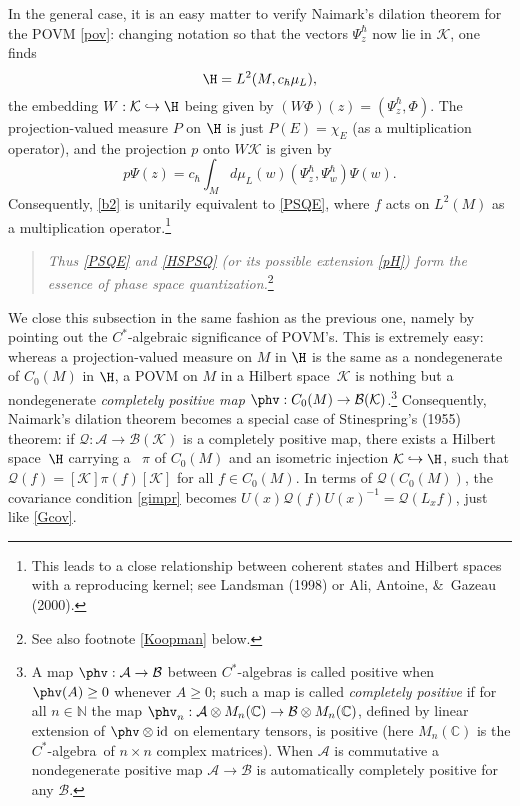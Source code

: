 \documentclass[12pt,titlepage]{article}
\newcommand{\beq}{\begin{equation}}
\newcommand{\eeq}{\end{equation}}
\newcommand{\ca}{$C^*$-algebra} \newcommand{\jba}{JB-algebra}
\newcommand{\Hs}{Hilbert space} \newcommand{\Bs}{Banach space}
\newcommand{\id}{\mbox{\rm id}}
\newcommand{\raw}{\rightarrow} \newcommand{\rat}{\mapsto}
\newcommand{\hraw}{\hookrightarrow} \newcommand{\Law}{\Leftarrow}
\newcommand{\x}{\times} \newcommand{\hb}{\hbar}
\newcommand{\inv}{^{-1}} \newcommand{\sa}{_{\R}}
\newcommand{\er}{\eqref}
\newcommand{\ch}{\chi} \newcommand{\ps}{\psi} \newcommand{\Ps}{\Psi}
\newcommand{\CA}{{\mathcal A}} \newcommand{\CB}{{\mathcal B}}
\newcommand{\CK}{{\mathcal K}}   \newcommand{\CL}{{\mathcal L}}
\newcommand{\CQ}{{\mathcal Q}} \newcommand{\CR}{{\mathcal R}}
\renewcommand{\C}{{\mathbb C}} \newcommand{\D}{{\mathbb D}}
\newcommand{\N}{{\mathbb N}} \newcommand{\R}{{\mathbb R}}
\begin{document}
 In the general case, it is an easy matter to verify Naimark's dilation theorem for the POVM \er{pov}:
 changing notation so that the vectors $\Psi_z^{\hbar}$ now lie in $\CK$,
 one finds 
 \beq \H=L^2(M, c_{\hbar}\mu_L), \label{HSPSQ}
 \eeq
 the embedding $W:\CK\hraw\H$ being given by $(W\Phi)(z)=(\Psi^{\hbar}_z,\Phi)$. The projection-valued measure $P$ on $\H$ is just $P(E)=\ch_E$ (as a multiplication operator), and the projection $p$ onto $W\CK$ is given by 
 \beq p\Psi(z)=c_{\hbar} \int_M  d\mu_L(w) (\Psi^{\hbar}_{z},\Psi^{\hbar}_{w})\Psi(w).\eeq
 Consequently, \er{b2} is unitarily equivalent
 to \er{PSQE}, where $f$ acts on $L^2(M)$ as a multiplication operator.\footnote{This leads to a close relationship between coherent states and \Hs s with a reproducing kernel; see Landsman (1998) or Ali, Antoine, \&\ Gazeau (2000).}  
\begin{quote}{\it Thus \er{PSQE} and \er{HSPSQ} (or its possible extension \er{pH}) form the essence of phase space quantization.}\footnote{See also footnote  \ref{Koopman} below.}
\end{quote}
  
 We close this subsection in the same fashion as the previous one, namely by pointing out the \ca ic significance of POVM's. This is extremely easy: whereas
 a projection-valued measure on $M$  in $\H$ is the same as a nondegenerate {\it \rep} of $C_0(M)$ in $\H$, a POVM  on $M$  in a \Hs\ $\CK$ is nothing but a nondegenerate {\it completely positive map} $\phv:C_0(M)\raw \mathcal{B}(\CK)$.\footnote{A map  $\phv:\CA\raw\CB$ between \ca s is called positive when $\phv(A)\geq 0$
 whenever $A\geq 0$; such a map is called {\it completely positive} if for all $n\in \N$ the map $\phv_n: \CA\otimes M_n(\C)\raw  \CB\otimes M_n(\C)$, defined by linear extension of $\phv\otimes\id$ on elementary tensors, is positive (here $M_n(\C)$ is the \ca\ of $n\x n$ complex matrices). When $\CA$ is commutative
 a nondegenerate positive map $\CA\raw \CB$ is automatically completely positive for any $\CB$.}
 Consequently, Naimark's dilation theorem becomes a special case of Stinespring's (1955) theorem: if $\CQ:\CA\raw \CB(\CK)$ is a completely positive map,  there exists a \Hs\ $\H$ carrying a \rep\ $\pi$ of $C_0(M)$
 and an isometric injection $\CK\hraw\H$, such that $\CQ(f)=[\CK]\pi(f)[\CK]$ for all $f\in C_0(M)$. In terms of $\CQ(C_0(M))$, the covariance condition
 \er{gimpr} becomes  $U(x)\CQ(f)U(x)\inv=\CQ(L_xf)$, just like 
 \er{Gcov}. 
\end{document}
